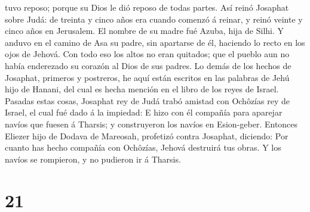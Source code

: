 tuvo reposo; porque su Dios le dió reposo de todas partes.
 Así reinó Josaphat sobre Judá: de treinta y cinco años
era cuando comenzó á reinar, y reinó veinte y cinco años en Jerusalem.
El nombre de su madre fué Azuba, hija de Silhi.  Y anduvo
en el camino de Asa su padre, sin apartarse de él, haciendo lo recto en
los ojos de Jehová.  Con todo eso los altos no eran
quitados; que el pueblo aun no había enderezado su corazón al Dios de
sus padres.  Lo demás de los hechos de Josaphat, primeros
y postreros, he aquí están escritos en las palabras de Jehú hijo de
Hanani, del cual es hecha mención en el libro de los reyes de Israel.
 Pasadas estas cosas, Josaphat rey de Judá trabó amistad
con Ochôzías rey de Israel, el cual fué dado á la impiedad:
 E hizo con él compañía para aparejar navíos que fuesen á
Tharsis; y construyeron los navíos en Esion-geber. 
Entonces Eliezer hijo de Dodava de Mareosah, profetizó contra Josaphat,
diciendo: Por cuanto has hecho compañía con Ochôzías, Jehová destruirá
tus obras. Y los navíos se rompieron, y no pudieron ir á Tharsis.

\hypertarget{section-20}{%
\section{21}\label{section-20}}

